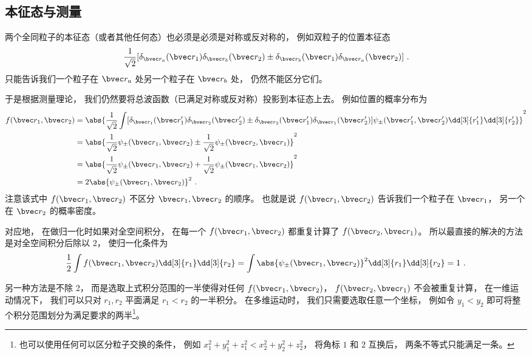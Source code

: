 
\subsection{本征态与测量}
两个全同粒子的本征态（或者其他任何态）也必须是必须是对称或反对称的， 例如双粒子的位置本征态
$$\frac{1}{\sqrt 2}[\delta_{\bvec r_a}(\bvec r_1) \delta_{\bvec r_b}(\bvec r_2)\pm \delta_{\bvec r_b}(\bvec r_1) \delta_{\bvec r_a}(\bvec r_2)]~.$$
只能告诉我们一个粒子在 $\bvec r_a$ 处另一个粒子在 $\bvec r_b$ 处， 仍然不能区分它们。

于是根据测量理论， 我们仍然要将总波函数（已满足对称或反对称）投影到本征态上去。 例如位置的概率分布为
\begin{equation}\label{eq_ExchOp_1}
\begin{aligned}
f(\bvec r_1, \bvec r_2) &= \abs{\frac{1}{\sqrt{2}}\int [\delta_{\bvec r_1}(\bvec r'_1) \delta_{\bvec r_2}(\bvec r'_2) \pm \delta_{\bvec r_2}(\bvec r'_1) \delta_{\bvec r_1}(\bvec r'_2)] \psi_\pm(\bvec r'_1,\bvec r'_2) \dd[3]{r'_1}\dd[3]{r'_2}}^2\\
&= \abs{\frac{1}{\sqrt{2}} \psi_\pm(\bvec r_1, \bvec r_2) \pm  \frac{1}{\sqrt{2}} \psi_\pm(\bvec r_2, \bvec r_1)}^2\\
&= \abs{\frac{1}{\sqrt{2}} \psi_\pm(\bvec r_1, \bvec r_2) +  \frac{1}{\sqrt{2}} \psi_\pm(\bvec r_1, \bvec r_2)}^2\\
&= 2\abs{\psi_\pm(\bvec r_1, \bvec r_2)}^2~.
\end{aligned}
\end{equation}
注意该式中 $f(\bvec r_1, \bvec r_2)$ 不区分 $\bvec r_1, \bvec r_2$ 的顺序。 也就是说 $f(\bvec r_1, \bvec r_2)$ 告诉我们一个粒子在 $\bvec r_1$， 另一个在 $\bvec r_2$ 的概率密度。

对应地， 在做归一化时如果对全空间积分， 在每一个 $f(\bvec r_1, \bvec r_2)$ 都重复计算了 $f(\bvec r_2, \bvec r_1)$。 所以最直接的解决的方法是对全空间积分后除以 $2$， 使归一化条件为
\begin{equation}\label{eq_ExchOp_2}
\frac{1}{2}\int f(\bvec r_1, \bvec r_2) \dd[3]{r_1}\dd[3]{r_2} = \int \abs{\psi_\pm(\bvec r_1, \bvec r_2)}^2 \dd[3]{r_1}\dd[3]{r_2} = 1~.
\end{equation}

另一种方法是不除 2， 而是选取上式积分范围的一半使得对任何 $f(\bvec r_1, \bvec r_2)$， $f(\bvec r_2, \bvec r_1)$ 不会被重复计算， 在一维运动情况下， 我们可以只对 $r_1, r_2$ 平面满足 $r_1 < r_2$ 的一半积分。 在多维运动时， 我们只需要选取任意一个坐标， 例如令 $y_1 < y_2$ 即可将整个积分范围划分为满足要求的两半\footnote{也可以使用任何可以区分粒子交换的条件， 例如 $x_1^2 + y_1^2 + z_1^2 < x_2^2 + y_2^2 + z_2^2$， 将角标 $1$ 和 $2$ 互换后， 两条不等式只能满足一条。}。

